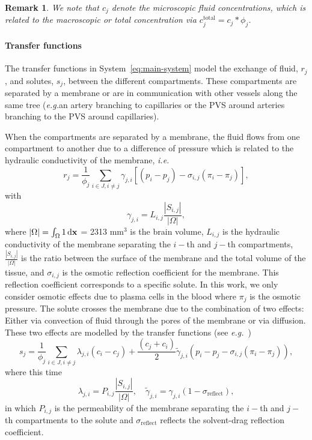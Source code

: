 \documentclass[10pt]{article}
\newcommand{\ie}{\emph{i.e.}\;}
\newcommand{\eg}{\emph{e.g.}\;}
\newcommand{\1}{^{(1)}}
\newcommand{\2}{^{(2)}}
\newcommand*{\dd}{\mathop{\kern0pt\mathrm{d}}\!{}}
\newcommand {\f}   {\frac}
\newcommand{\abs}[1]{\left\lvert#1\right\rvert}
\newcommand {\x}   {\mathbf{x}}
\newtheorem{remark}[theorem]{Remark}
\begin{document}
\begin{remark}
    We note that $c_j$ denote the microscopic fluid concentrations, which is related to the macroscopic or total concentration via $c_j^\text{total} = c_j*\phi_j$.
\end{remark}

\paragraph{Transfer functions}
The transfer functions in System~\eqref{eq:main-system} model the exchange of fluid, $r_j$, and solutes, $s_j$, between the different compartments. 
These compartments are separated by a membrane or are in communication with other vessels along the same tree (\eg an artery branching to capillaries or the PVS around arteries branching to the PVS around capillaries).

When the compartments are separated by a membrane, the fluid flows from one compartment to another due to a difference of pressure which is related to the hydraulic conductivity of the membrane, \ie 
\begin{equation}
    r_j = \frac{1}{\phi_j}\sum_{i\in J, i\neq j} \gamma_{j , i} \left[(p_i - p_j)-\sigma_{i,j}(\pi_i-\pi_j)\right],
\end{equation} 
with 
\begin{equation}
\gamma_{j , i} = L_{i,j} \f{\abs{S_{i,j}}}{\abs{\Omega}},
\end{equation}
where $|\Omega| = \int_\Omega 1 \dd \x$ = 2313 mm$^3$ is the brain volume, $L_{i,j}$ is the hydraulic conductivity of the membrane separating the $i-$th and $j-$th compartments, $\f{\abs{S_{i,j}}}{\abs{\Omega}}$ is the ratio between the surface of the membrane and the total volume of the tissue, and $\sigma_{i,j}$ is the osmotic reflection coefficient for the membrane. This reflection coefficient corresponds to a specific solute. In this work, we only consider osmotic effects due to plasma cells in the blood where $\pi_j$ is the osmotic pressure. 
The solute crosses the membrane due to the combination of two effects: Either via convection of fluid through the pores of the membrane or via diffusion. These two effects are modelled by the transfer functions (see \eg~\cite{jarzynska2006application})
\begin{equation}
    s_j = \frac{1}{\phi_j}  \sum_{i\in J, i\neq j}\lambda_{j , i} ( c_i- c_j) +  \frac{(c_j+c_i)}{2} \tilde \gamma_{j , i} (p_i - p_j-\sigma_{i,j}(\pi_i-\pi_j)) ,
\end{equation}
where this time 
\[
    \lambda_{j , i} = P_{i,j} \f{\abs{S_{i,j}}}{\abs{\Omega}}, \quad \tilde \gamma_{j , i} =  \gamma_{j , i} (1-\sigma_\text{reflect}),
\]
in which $P_{i,j}$ is the permeability of the membrane separating the $i-$th and $j-$th compartments to the solute and $\sigma_\text{reflect}$ reflects the solvent-drag reflection coefficient. 
\end{document}
